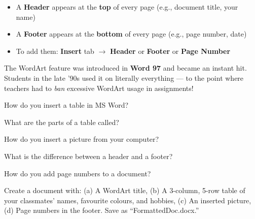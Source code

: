 \begin{theorybox}
\begin{itemize}[leftmargin=*, label={\textcolor{ModuleBlue}{\faAngleRight}}, itemsep=3pt]
  \item A \textbf{Header} appears at the \textbf{top} of every page (e.g., document title, your name)
  \item A \textbf{Footer} appears at the \textbf{bottom} of every page (e.g., page number, date)
  \item To add them: \textbf{Insert} tab $\rightarrow$ \textbf{Header} or \textbf{Footer} or \textbf{Page Number}
\end{itemize}
\end{theorybox}


\begin{funfact}
The WordArt feature was introduced in \textbf{Word 97} and became an instant hit. Students in the late '90s used it on literally everything --- to the point where teachers had to \emph{ban} excessive WordArt usage in assignments!
\end{funfact}

\begin{reviewqs}
  \item How do you insert a table in MS Word?
  \item What are the parts of a table called?
  \item How do you insert a picture from your computer?
  \item What is the difference between a header and a footer?
  \item How do you add page numbers to a document?
\end{reviewqs}

\begin{challenge}
Create a document with: (a) A WordArt title, (b) A 3-column, 5-row table of your classmates' names, favourite colours, and hobbies, (c) An inserted picture, (d) Page numbers in the footer. Save as ``FormattedDoc.docx.''
\end{challenge}
